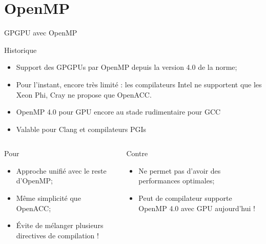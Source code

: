 \documentclass[handout,francais]{beamer}
\begin{document}
\section{OpenMP}

\begin{frame}[fragile]{GPGPU avec OpenMP}
\scriptsize
\begin{block}{Historique}
\begin{itemize}
\item Support des GPGPUs par OpenMP depuis la version 4.0 de la norme;
\item Pour l'instant, encore très limité : les compilateurs Intel ne
supportent que les Xeon Phi, Cray ne propose que OpenACC.
\item OpenMP 4.0 pour GPU encore au stade rudimentaire pour GCC
\item Valable pour Clang et compilateurs PGIs
\end{itemize}
\end{block}

\begin{columns}
\begin{column}{0.5\textwidth}
\begin{exampleblock}{Pour}
\begin{itemize}
\item Approche unifié avec le reste d'OpenMP;
\item Même simplicité que OpenACC;
\item \'Evite de mélanger plusieurs directives de compilation !
\end{itemize}
\end{exampleblock}
\end{column}
\begin{column}{0.5\textwidth}
\begin{alertblock}{Contre}
\begin{itemize}
\item Ne permet pas d'avoir des performances optimales;
\item Peut de compilateur supporte OpenMP 4.0 avec GPU aujourd'hui !
\end{itemize}
\end{alertblock}
\end{column}
\end{columns}
\end{frame}
\end{document}
